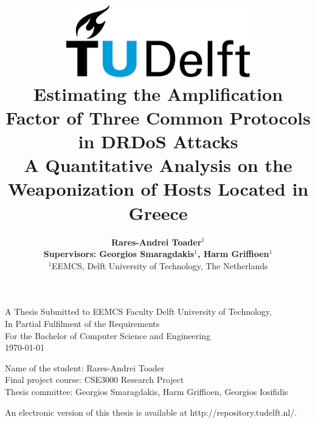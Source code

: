 \title{
    \includegraphics[width=8cm, keepaspectratio]{tudelftlogo.png}\\
    \vspace*{2cm}
    \textbf{
        Estimating the Amplification Factor of Three Common Protocols in DRDoS Attacks\\
        {\large A Quantitative Analysis on the Weaponization of Hosts Located in Greece}
    }\\
    \vspace*{1cm}
}

\author{
     \textbf{
Rares-Andrei Toader$^1$}\\
    \hfill \break
    \textbf{Supervisors: Georgios Smaragdakis$^1$, Harm Griffioen$^1$ }\\
    \break
    {\large 
        \hfill \break
        $^1$EEMCS, Delft University of Technology, The Netherlands
    }\\
}

\date{}

\maketitle
\thispagestyle{empty}

\let\clearpagebackup\clearpage
\renewcommand{\clearpage}{ }

\onecolumn

\vspace*{1.5cm}
\begin{center}
    A Thesis Submitted to EEMCS Faculty Delft University of Technology,\\
    In Partial Fulfilment of the Requirements\\
    For the Bachelor of Computer Science and Engineering\\
    \today
\end{center}

\vspace*{2cm}

\noindent
{\small
Name of the student: Rares-Andrei Toader \\
Final project course: CSE3000 Research Project\\
Thesis committee: Georgios Smaragdakis, Harm Griffioen, Georgios Iosifidis	
\\
}
\vfill

\begin{center}
    An electronic version of this thesis is available at http://repository.tudelft.nl/.
\end{center}

\twocolumn
\let\clearpage\clearpagebackup  
\clearpage
\setcounter{page}{1}

